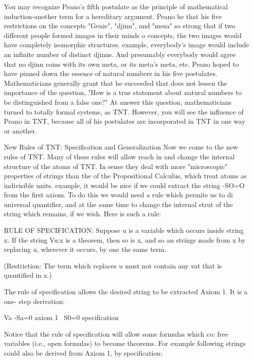          You may recognize Peano's fifth postulate as the principle of mathematical
induction-another term for a hereditary argument. Peano he that his five restrictions on
the concepts "Genie", "djinn", and "mesa" so strong that if two different people formed
images in their minds o concepts, the two images would have completely isomorphic
structures. example, everybody's image would include an infinite number of distinct
djinns. And presumably everybody would agree that no djinn coins with its own meta, or
its meta's meta, etc.
         Peano hoped to have pinned down the essence of natural numbers in his five
postulates. Mathematicians generally grant that he succeeded that does not lessen the
importance of the question, "How is a true statement about natural numbers to be
distinguished from a false one?" At answer this question, mathematicians turned to totally
formal systems, as TNT. However, you will see the influence of Peano in TNT, because
all of his postulates are incorporated in TNT in one way or another.

            New Rules of TNT: Specification and Generalization
Now we come to the new rules of TNT. Many of these rules will allow reach in and
change the internal structure of the atoms of TNT. In sense they deal with more
"microscopic" properties of strings than the of the Propositional Calculus, which treat
atoms as indivisible units. example, it would be nice if we could extract the string -SO=O
from the first axiom. To do this we would need a rule which permits us to di universal
quantifier, and at the same time to change the internal strut of the string which remains, if
we wish. Here is such a rule:

RULE OF SPECIFICATION: Suppose u is a variable which occurs inside string x. If the
string Vu:x is a theorem, then so is x, and so an strings made from x by replacing u,
wherever it occurs, by one the same term.

       (Restriction: The term which replaces u must not contain any vat that is quantified
       in x.)

The rule of specification allows the desired string to be extracted Axiom 1. It is a one-
step derivation:

                          Va -Sa=0                       axiom 1
                          ~S0=0                          specification

Notice that the rule of specification will allow some formulas which co: free variables
(i.e., open formulas) to become theorems. For example following strings could also be
derived from Axiom 1, by specification:

